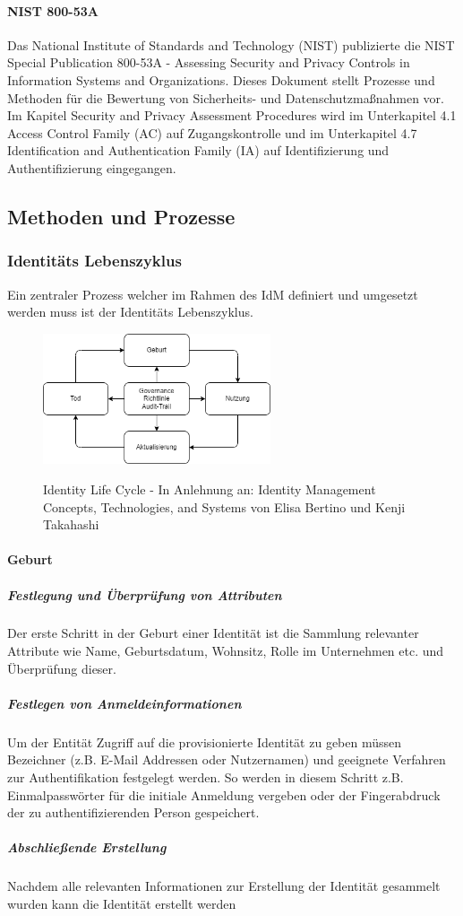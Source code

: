 \documentclass[12pt]{article}
\begin{document}
\paragraph{NIST 800-53A}
Das National Institute of Standards and Technology (NIST) publizierte die \glqq{}NIST Special Publication 800-53A - Assessing Security and Privacy Controls in Information Systems and Organizations\grqq{}. Dieses Dokument stellt Prozesse und Methoden für die Bewertung von Sicherheits- und Datenschutzmaßnahmen vor. Im Kapitel \glqq{}Security and Privacy Assessment Procedures\grqq{} wird im Unterkapitel 4.1 \glqq{}Access Control Family (AC)\grqq{} auf Zugangskontrolle und im Unterkapitel 4.7 \glqq{}Identification and Authentication Family (IA)\grqq{} auf Identifizierung und Authentifizierung eingegangen.
\subsection{Methoden und Prozesse}
\subsubsection{Identitäts Lebenszyklus}
Ein zentraler Prozess welcher im Rahmen des IdM definiert und umgesetzt werden muss ist der Identitäts Lebenszyklus.
\begin{figure}[H]
  \centering
  \includegraphics[width=0.6\textwidth]{assets/idlc.png}
  \label{fig:idlc}
  \caption{Identity Life Cycle - In Anlehnung an: Identity Management Concepts, Technologies, and Systems von Elisa Bertino und Kenji Takahashi}
\end{figure}
\paragraph{Geburt}
\subparagraph{Festlegung und Überprüfung von Attributen}
Der erste Schritt in der Geburt einer Identität ist die Sammlung relevanter Attribute wie Name, Geburtsdatum, Wohnsitz, Rolle im Unternehmen etc. und Überprüfung dieser.
\subparagraph{Festlegen von Anmeldeinformationen}
Um der Entität Zugriff auf die provisionierte Identität zu geben müssen Bezeichner (z.B. E-Mail Addressen oder Nutzernamen) und geeignete Verfahren zur Authentifikation festgelegt werden. So werden in diesem Schritt z.B. Einmalpasswörter für die initiale Anmeldung vergeben oder der Fingerabdruck der zu authentifizierenden Person gespeichert.
\subparagraph{Abschließende Erstellung}
Nachdem alle relevanten Informationen zur Erstellung der Identität gesammelt wurden kann die Identität erstellt werden
\end{document}
